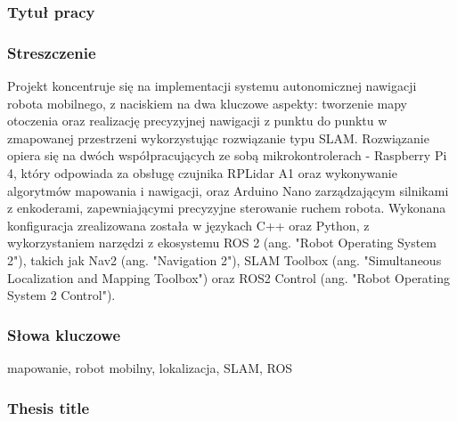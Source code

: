 \documentclass[a4paper,twoside,12pt]{book}
\begin{document}


\cleardoublepage

\rmfamily\normalfont
\pagestyle{empty}


\subsubsection*{Tytuł pracy} 
\Title
\subsubsection*{Streszczenie}  
Projekt koncentruje się na implementacji systemu autonomicznej nawigacji robota mobilnego, z naciskiem na dwa kluczowe aspekty: tworzenie mapy otoczenia oraz realizację precyzyjnej nawigacji z punktu do punktu w zmapowanej przestrzeni wykorzystując rozwiązanie typu SLAM. Rozwiązanie opiera się na dwóch współpracujących ze sobą mikrokontrolerach - Raspberry Pi 4, który odpowiada za obsługę czujnika RPLidar A1 oraz wykonywanie algorytmów mapowania i nawigacji, oraz Arduino Nano zarządzającym silnikami z enkoderami, zapewniającymi precyzyjne sterowanie ruchem robota. Wykonana konfiguracja zrealizowana została w językach C++ oraz Python, z wykorzystaniem narzędzi z ekosystemu ROS 2 (ang. "Robot Operating System 2"), takich jak Nav2 (ang. "Navigation 2"), SLAM Toolbox (ang. "Simultaneous Localization and Mapping Toolbox") oraz ROS2 Control (ang. "Robot Operating System 2 Control").


\subsubsection*{Słowa kluczowe} 
mapowanie, robot mobilny, lokalizacja, SLAM, ROS
\subsubsection*{Thesis title} 
\begin{otherlanguage}{british}
\TitleAlt
\end{otherlanguage}
\end{document}
